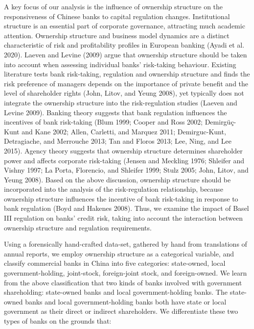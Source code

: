 \documentclass{article}
\begin{document}
A key focus of our analysis is the influence of ownership structure on
the responsiveness of Chinese banks to capital regulation changes.
Institutional structure is an essential part of corporate governance,
attracting much academic attention. Ownership structure and business
model dynamics are a distinct characteristic of risk and profitability
profiles in European banking (Ayadi et al. 2020). Laeven and Levine
(2009) argue that ownership structure should be taken into account when
assessing individual banks' risk-taking behaviour. Existing literature
tests bank risk-taking, regulation and ownership structure and finds the
risk preference of managers depends on the importance of private benefit
and the level of shareholder rights (John, Litov, and Yeung 2008), yet
typically does not integrate the ownership structure into the
risk-regulation studies (Laeven and Levine 2009). Banking theory
suggests that bank regulation influences the incentives of bank
risk-taking (Blum 1999; Cooper and Ross 2002; Demirgüç-Kunt and Kane
2002; Allen, Carletti, and Marquez 2011; Demirguc-Kunt, Detragiache, and
Merrouche 2013; Tan and Floros 2013; Lee, Ning, and Lee 2015). Agency
theory suggests that ownership structure determines shareholder power
and affects corporate risk-taking (Jensen and Meckling 1976; Shleifer
and Vishny 1997; La Porta, Florencio, and Shleifer 1999; Stulz 2005;
John, Litov, and Yeung 2008). Based on the above discussion, ownership
structure should be incorporated into the analysis of the
risk-regulation relationship, because ownership structure influences the
incentive of bank risk-taking in response to bank regulation (Boyd and
Hakenes 2008). Thus, we examine the impact of Basel III regulation on
banks' credit risk, taking into account the interaction between
ownership structure and regulation requirements.

Using a forensically hand-crafted data-set, gathered by hand from
translations of annual reports, we employ ownership structure as a
categorical variable, and classify commercial banks in China into five
categories: state-owned, local government-holding, joint-stock,
foreign-joint stock, and foreign-owned. We learn from the above
classification that two kinds of banks involved with government
shareholding: state-owned banks and local government-holding banks. The
state-owned banks and local government-holding banks both have state or
local government as their direct or indirect shareholders. We
differentiate these two types of banks on the grounds that:
\end{document}
